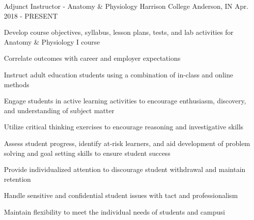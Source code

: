 \begin{cventries}
  \cventry
    {Adjunct Instructor - Anatomy \& Physiology}
    {Harrison College}
    {Anderson, IN}
    {Apr. 2018 - PRESENT}
    {
      \begin{cvitems}
      \item {Develop course objectives, syllabus, lesson plans, tests, and lab activities for Anatomy \& Physiology I course} 
      \item {Correlate outcomes with career and employer expectations}
        \item {Instruct adult education students using a combination of in-class and online methods}
        \item {Engage students in active learning activities to encourage enthusiasm, discovery, and understanding of subject matter}
      \item {Utilize critical thinking exercises to encourage reasoning and investigative skills}
      \item {Assess student progress, identify at-risk learners, and aid development of problem solving and goal setting skills to ensure student success}
      \item {Provide individualized attention to discourage student withdrawal and maintain retention}
      \item {Handle sensitive and confidential student issues with tact and professionalism}
      \item {Maintain flexibility to meet the individual needs of students and campus}i
  \end{cvitems}
    }


\end{cventries}
